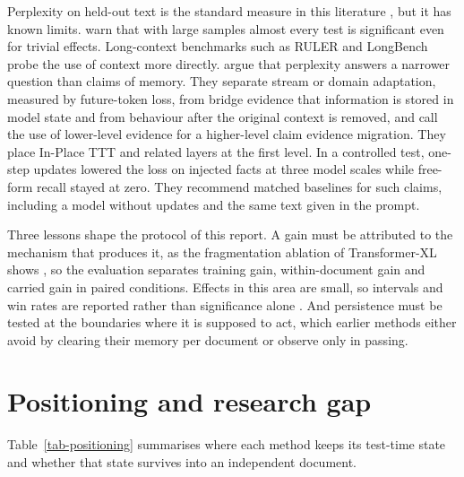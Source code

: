 \documentclass[12pt,a4paper]{report}
\begin{document}
Perplexity on held-out text is the standard measure in this literature \citep{krause2018dynamic,lazaridou2021mind}, but it has known limits. \citet{meister2021beyond} warn that with large samples almost every test is significant even for trivial effects. Long-context benchmarks such as RULER \citep{hsieh2024ruler} and LongBench \citep{bai2023longbench} probe the use of context more directly. \citet{song2026beyond} argue that perplexity answers a narrower question than claims of memory. They separate stream or domain adaptation, measured by future-token loss, from bridge evidence that information is stored in model state and from behaviour after the original context is removed, and call the use of lower-level evidence for a higher-level claim evidence migration. They place In-Place TTT and related layers at the first level. In a controlled test, one-step updates lowered the loss on injected facts at three model scales while free-form recall stayed at zero. They recommend matched baselines for such claims, including a model without updates and the same text given in the prompt.

Three lessons shape the protocol of this report. A gain must be attributed to the mechanism that produces it, as the fragmentation ablation of Transformer-XL shows \citep{dai2019transformerxl}, so the evaluation separates training gain, within-document gain and carried gain in paired conditions. Effects in this area are small, so intervals and win rates are reported rather than significance alone \citep{meister2021beyond}. And persistence must be tested at the boundaries where it is supposed to act, which earlier methods either avoid by clearing their memory per document \citep{wu2022memorizing} or observe only in passing.

\section{Positioning and research gap}
\label{sec-lit-gap}

Table~\ref{tab-positioning} summarises where each method keeps its test-time state and whether that state survives into an independent document.
\end{document}

